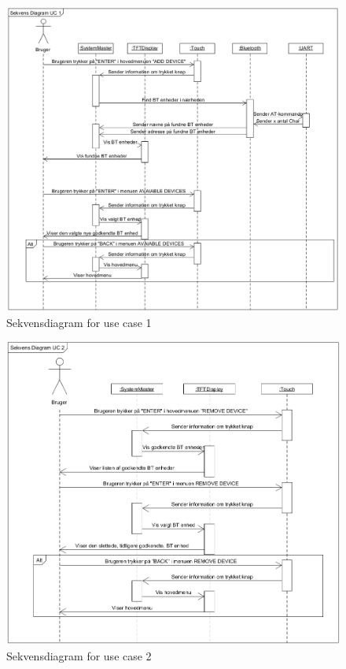 \begin{figure}[H]
	\centering
	\includegraphics[width = 400 pt]{Img/SD1.png}
	\caption{Sekvensdiagram for use case 1}
	\label{fig:SD1}
\end{figure}

\begin{figure}[H]
	\centering
	\includegraphics[width = 400 pt]{Img/SD2.png}
	\caption{Sekvensdiagram for use case 2}
	\label{fig:SD2}
\end{figure}

